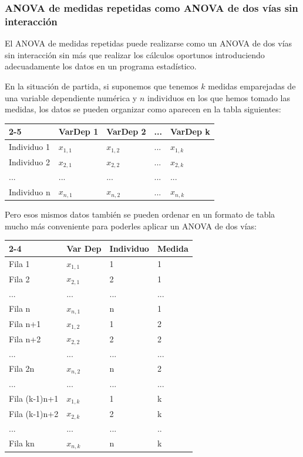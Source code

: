 \documentclass[
  a4paper,
]{scrreport}
\theoremstyle{plain}
\theoremstyle{definition}
\theoremstyle{definition}
\theoremstyle{remark}
\begin{document}
\subsubsection{ANOVA de medidas repetidas como ANOVA de dos vías sin
interacción}\label{anova-de-medidas-repetidas-como-anova-de-dos-vuxedas-sin-interacciuxf3n}

El ANOVA de medidas repetidas puede realizarse como un ANOVA de dos vías
sin interacción sin más que realizar los cálculos oportunos
introduciendo adecuadamente los datos en un programa estadístico.

En la situación de partida, si suponemos que tenemos \(k\) medidas
emparejadas de una variable dependiente numérica y \(n\) individuos en
los que hemos tomado las medidas, los datos se pueden organizar como
aparecen en la tabla siguientes:

\begin{longtable}[]{@{}lllll@{}}
\toprule\noalign{}
2-5 & VarDep 1 & VarDep 2 & ... & VarDep k \\
\midrule\noalign{}
\endhead
\bottomrule\noalign{}
\endlastfoot
Individuo 1 & \(x_{1,1}\) & \(x_{1,2}\) & ... & \(x_{1,k}\) \\
Individuo 2 & \(x_{2,1}\) & \(x_{2,2}\) & ... & \(x_{2,k}\) \\
... & ... & ... & ... & ... \\
Individuo n & \(x_{n,1}\) & \(x_{n,2}\) & ... & \(x_{n,k}\) \\
\end{longtable}

Pero esos mismos datos también se pueden ordenar en un formato de tabla
mucho más conveniente para poderles aplicar un ANOVA de dos vías:

\begin{longtable}[]{@{}llll@{}}
\toprule\noalign{}
2-4 & Var Dep & Individuo & Medida \\
\midrule\noalign{}
\endhead
\bottomrule\noalign{}
\endlastfoot
Fila 1 & \(x_{1,1}\) & 1 & 1 \\
Fila 2 & \(x_{2,1}\) & 2 & 1 \\
... & ... & ... & ... \\
Fila n & \(x_{n,1}\) & n & 1 \\
Fila n+1 & \(x_{1,2}\) & 1 & 2 \\
Fila n+2 & \(x_{2,2}\) & 2 & 2 \\
... & ... & ... & ... \\
Fila 2n & \(x_{n,2}\) & n & 2 \\
... & ... & ... & ... \\
Fila (k-1)n+1 & \(x_{1,k}\) & 1 & k \\
Fila (k-1)n+2 & \(x_{2,k}\) & 2 & k \\
... & ... & ... & .. \\
Fila kn & \(x_{n,k}\) & n & k \\
\end{longtable}
\end{document}
